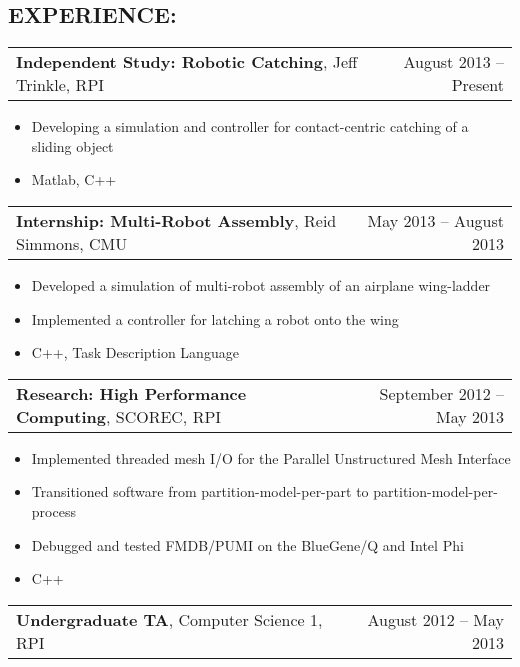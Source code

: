\documentclass[margin]{res}
\begin{document}
\begin{resume}
 \section{EXPERIENCE:}      
	\begin{tabular}{p{4in} r}
    {\bf Independent Study: Robotic Catching}, Jeff Trinkle, RPI & August 2013 -- Present
  \end{tabular}
  \begin{itemize}
    \item Developing a simulation and controller for contact-centric catching of a sliding object
    \item Matlab, C++
  \end{itemize}
	\vspace{-1.5mm}
	\begin{tabular}{p{4in} r}
    {\bf Internship: Multi-Robot Assembly}, Reid Simmons, CMU & May 2013 -- August 2013
  \end{tabular}
  \begin{itemize}
    \item Developed a simulation of multi-robot assembly of an airplane wing-ladder
    \item Implemented a controller for latching a robot onto the wing 
    \item C++, Task Description Language
  \end{itemize}
	\vspace{-1.5mm}
	\begin{tabular}{p{4in} r}
		{\bf Research: High Performance Computing}, SCOREC, RPI	& September 2012 -- May 2013\\
	\end{tabular}
	\begin{itemize}
		\item Implemented threaded mesh I/O for the Parallel Unstructured Mesh Interface
    \item Transitioned software from partition-model-per-part to partition-model-per-process
		\item Debugged and tested FMDB/PUMI on the BlueGene/Q and Intel Phi
    \item C++
	\end{itemize}
	\vspace{-1.5mm}
	\begin{tabular}{p{4in} r}
	  {\bf Undergraduate TA}, Computer Science 1, RPI 			& August 2012 -- May 2013\\
	\end{tabular}
	\begin{itemize}

\end{itemize}
\end{resume}
\end{document}
